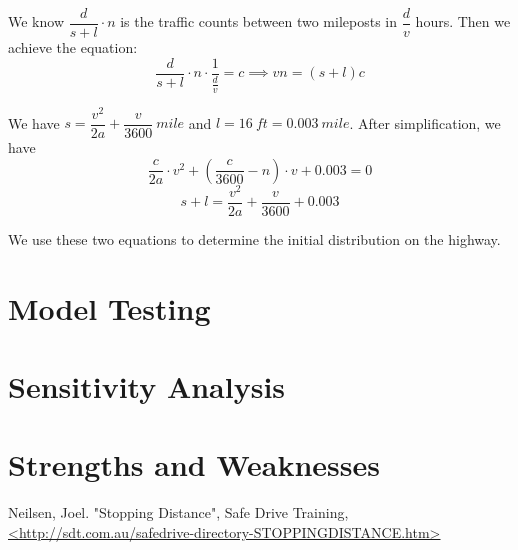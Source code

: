 \documentclass[a4paper]{article}
\begin{document}
	We know $ \dfrac{d}{s+l}\cdot n $ is the traffic counts between two mileposts in $ \dfrac{d}{v} $ hours. Then we achieve the equation:
	$$ \dfrac{d}{s+l}\cdot n\cdot\frac{1}{\frac{d}{v}}=c\implies vn=(s+l)c $$

	We have $ s=\dfrac{v^2}{2a}+\dfrac{v}{3600}\ mile $ and $ l=16\ ft=0.003\ mile $. After simplification, we have
	$$ \dfrac{c}{2a}\cdot v^2+\left(\dfrac{c}{3600}-n\right)\cdot v+0.003=0 $$
	$$ s+l=\dfrac{v^2}{2a}+\dfrac{v}{3600}+0.003 $$

	We use these two equations to determine the initial distribution on the highway.


	\section{Model Testing}
	\section{Sensitivity Analysis}
	\section{Strengths and Weaknesses}

	\begin{thebibliography}{0}
		 Neilsen, Joel. "Stopping Distance", Safe Drive Training,  \url{<http://sdt.com.au/safedrive-directory-STOPPINGDISTANCE.htm>}
	\end{thebibliography}
\end{document}
